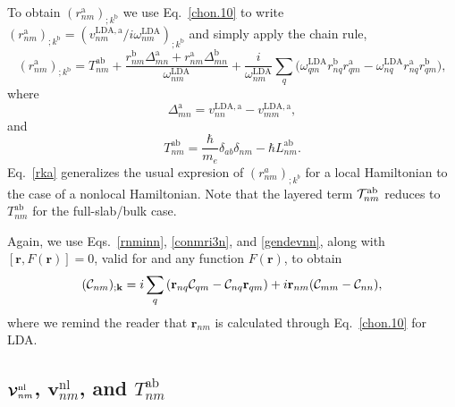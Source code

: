 \documentclass[floatfix,prb,aps,superscriptaddress,showpacs,letterpaper]{revtex4}
\begin{document}
To obtain $(r^{\mathrm{a}}_{nm})_{;k^{\mathrm{b}}}$ we use Eq.~\eqref{chon.10} to
write
$(r^{\mathrm{a}}_{nm})_{;k^{\mathrm{b}}}
=(v^{\mathrm{LDA},\mathrm{a}}_{nm}/i\omega^\mathrm{LDA}_{nm})_{;k^{\mathrm{b}}}
$ and simply apply the chain rule,
\begin{equation}
(r^{\mathrm{a}}_{nm})_{;k^{\mathrm{b}}}
=
T^{\mathrm{a}\mathrm{b}}_{nm}
+
\frac{ 
r^{\mathrm{b}}_{nm}
\Delta^{\mathrm{a}}_{mn}
+r^{\mathrm{a}}_{nm}
\Delta^{\mathrm{b}}_{mn}
}
{\omega^\mathrm{LDA}_{nm}}
+
\frac{i}{\omega^\mathrm{LDA}_{nm}}
\sum_{q}
\bigg(
\omega^\mathrm{LDA}_{q m} 
r^{\mathrm{b}}_{nq} 
r^{\mathrm{a}}_{q m}
-
\omega^\mathrm{LDA}_{nq} 
r^{\mathrm{a}}_{nq} 
r^{\mathrm{b}}_{q m}
\bigg)
,
\label{rka}
\end{equation} 
where 
\begin{equation*}
\Delta^{\mathrm{a}}_{mn}
=
v^{\mathrm{LDA},\mathrm{a}}_{nn}  
-
v^{\mathrm{LDA},\mathrm{a}}_{mm}  
,
\end{equation*}
and
\begin{equation}
T_{nm}^{\mathrm{a}\mathrm{b}}
=\frac{\hbar}{m_e}\delta_{ab}\delta_{nm} 
-\hbar L^{\mathrm{a}\mathrm{b}}_{nm} 
.
\label{tau.1n} 
\end{equation}
Eq.~\eqref{rka} generalizes the usual expresion of
$(r^a_{nm})_{;k^b}$ for a local 
Hamiltonian
\cite{aversaPRB95,nastosPRB05,cabellosPRB09,rashkeevPRB98}
to
the case of a
nonlocal Hamiltonian.
Note that the layered term
${\cal T}^{\mathrm{a}\mathrm{b}}_{nm}$ reduces to $T^{\mathrm{a}\mathrm{b}}_{nm}$
for the full-slab/bulk case.

Again, we use Eqs.~\eqref{rnminn}, \eqref{conmri3n}, and \eqref{gendevnn},
along with $[\mathbf{r},F(\mathbf{r})]=0$, valid for 
and any function $F(\mathbf{r})$, 
to obtain 
\begin{equation*} 
({\mathbf{\cal C}}_{nm})_{;\mathbf{k}}
=
i 
\sum_{q} 
 \left(\mathbf{r}_{nq}
{\mathbf{\cal C}}_{qm}
-
{\mathbf{\cal C}}_{nq}
\mathbf{r}_{qm}
\right) 
+i\mathbf{r}_{nm}({\mathbf{\cal C}}_{mm}-{\mathbf{\cal C}}_{nn}) 
,
\end{equation*} 
where we remind the reader that $\mathbf{r}_{nm}$ 
is calculated through 
Eq.~\eqref{chon.10} for LDA. 


\subsection{
\texorpdfstring{$\boldsymbol{\mathcal{\cal V}}^{\mathrm{nl}}_{nm}$}{Vnonlocal},
\texorpdfstring{$\mathbf{v}^\mathrm{nl}_{nm}$}{Vnonlocal}, and 
\texorpdfstring{$T^{\mathrm{a}\mathrm{b}}_{nm}$}{[r,vnl]}}
\label{vesnl}
\end{document}
